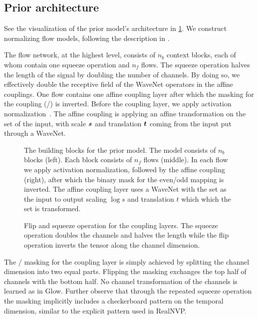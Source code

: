 \subsection{Prior architecture}

See the visualization of the prior model's architecture in \cref{fig:prior_network}. We construct normalizing flow models, following the description in \textcite{kimFloWaveNet2019}.

The flow network, at the highest level, consists of \(n_b\) context blocks, each of whom contain one squeeze operation and \(n_f\) flows. The squeeze operation halves the length of the signal by doubling the number of channels. By doing so, we effectively double the receptive field of the WaveNet operators in the affine couplings. One flow contains one affine coupling layer after which the masking for the coupling (/) is inverted. Before the coupling layer, we apply activation normalization~\cite{kingmaGlow2018}. The affine coupling is applying an affine transformation on the  set of the input, with scale \(\s\) and translation \(\B{t}\) coming from the  input put through a  WaveNet.

\begin{figure}[t]
    
    \caption{The building blocks for the prior model. The model consists of \(n_b\) blocks (left). Each block consists of \(n_f\) flows (middle). In each flow we apply activation normalization, followed by the affine coupling (right), after which the binary mask for the even/odd mapping is inverted. The affine coupling layer uses a WaveNet with the  set as the input to output scaling \(\log s\) and translation \(t\) which which the  set is transformed.}%
    \label{fig:prior_network}
\end{figure}

\begin{figure}
    \hspace*{-25pt}%
    \caption{Flip and squeeze operation for the coupling layers. The squeeze operation doubles the channels and halves the length while the flip operation inverts the tensor along the channel dimension.}%
    \label{fig:squeeze}%
\end{figure}

The / masking for the coupling layer is simply achieved by splitting the channel dimension into two equal parts. Flipping the masking exchanges the top half of channels with the bottom half. No channel transformation of the channels is learned as in Glow. Further observe that through the repeated squeeze operation the masking implicitly includes a checkerboard pattern on the temporal dimension, similar to the explicit pattern used in RealNVP\@.

